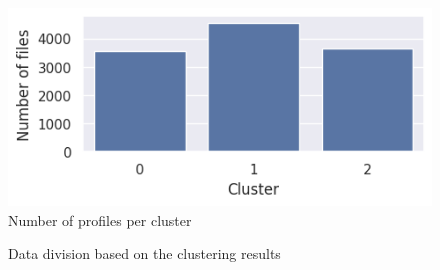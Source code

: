 \begin{figure}
    \centering
    \includegraphics{figures/pca_kmeans_cluster_distr.png}
    \caption{Number of profiles per cluster}
    \label{fig_a:cluster_distr}
\end{figure}

\begin{figure}[]
    \caption{Data division based on the clustering results}
    \label{fig_a:real_pca_kmeans}
\end{figure}

